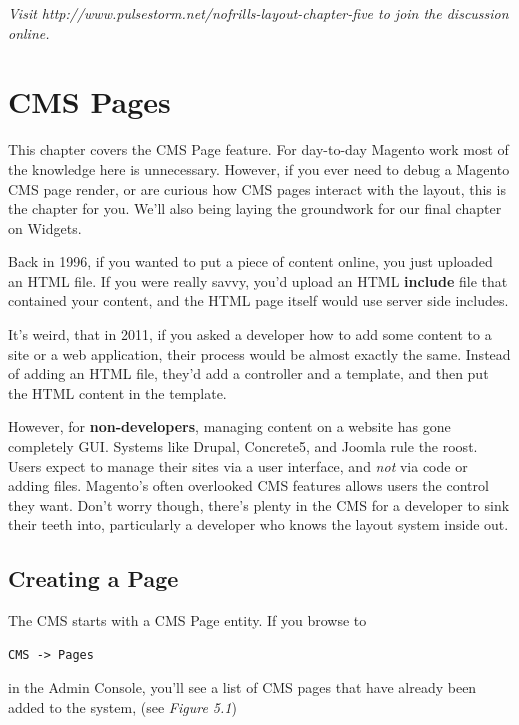 \documentclass[oneside]{book}
\begin{document}
\emph{Visit http://www.pulsestorm.net/nofrills-layout-chapter-five to join the discussion online.}
\chapter{CMS Pages}
This chapter covers the CMS Page feature.  For day-to-day Magento work most of the knowledge here is unnecessary.  However, if you ever need to debug a Magento CMS page render, or are curious how CMS pages interact with the layout, this is the chapter for you.  We'll also being laying the groundwork for our final chapter on Widgets.

Back in 1996, if you wanted to put a piece of content online, you just uploaded an HTML file.  If you were really savvy, you'd upload an HTML \textbf{include} file that contained your content, and the HTML page itself would use server side includes.

It's weird, that in 2011, if you asked a developer how to add some content to a site or a web application, their process would be almost exactly the same.  Instead of adding an HTML file, they'd add a controller and a template, and then put the HTML content in the template.

However, for \textbf{non-developers}, managing content on a website has gone completely GUI.  Systems like Drupal, Concrete5, and Joomla rule the roost.  Users expect to manage their sites via a user interface, and \emph{not} via code or adding files.  Magento's often overlooked CMS features allows users the control they want. Don't worry though, there's plenty in the CMS for a developer to sink their teeth into, particularly a developer who knows the layout system inside out.

\section{Creating a Page}

The CMS starts with a CMS Page entity. If you browse to

\begin{lstlisting}
CMS -> Pages

\end{lstlisting}


in the Admin Console, you'll see a list of CMS pages that have already been added to the system, (see \emph{Figure 5.1})
\end{document}
